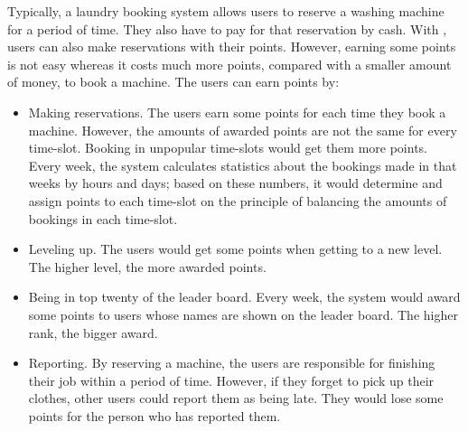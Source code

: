 Typically, a laundry booking system allows users to reserve a washing machine for a period of time. They also have to pay for that reservation by cash. With {\toolname}, users can also make reservations with their points. However, earning some points is not easy whereas it costs much more points, compared with a smaller amount of money, to book a machine. The users can earn points by:
\begin{itemize}
\item Making reservations. The users earn some points for each time they book a machine. However, the amounts of awarded points are not the same for every time-slot. Booking in unpopular time-slots would get them more points. Every week, the system calculates statistics about the bookings made in that weeks by hours and days; based on these numbers, it would determine and assign points to each time-slot on the principle of balancing the amounts of bookings in each time-slot.
\item Leveling up. The users would get some points when getting to a new level. The higher level, the more awarded points.
\item Being in top twenty of the leader board. Every week, the system would award some points to users whose names are shown on the leader board. The higher rank, the bigger award.
\item Reporting. By reserving a machine, the users are responsible for finishing their job within a period of time. However, if they forget to pick up their clothes, other users could report them as being late. They would lose some points for the person who has reported them.
\end{itemize}